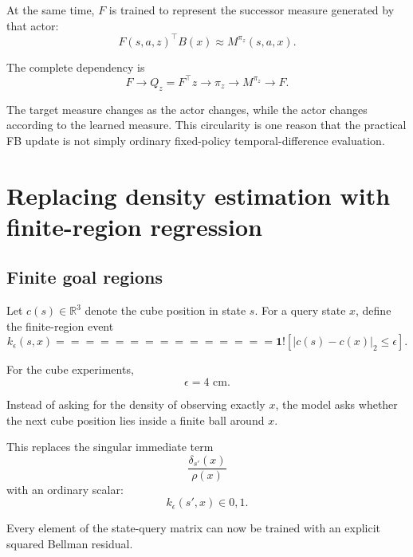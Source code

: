 \documentclass[10pt]{article}
\newcommand{\ind}[1]{\mathbf{1}!\left[#1\right]}
\begin{document}
At the same time, $F$ is trained to represent the successor measure generated by that
actor:
\begin{equation}
F(s,a,z)^\top B(x)
\approx
M^{\pi_z}(s,a,x).
\end{equation}

The complete dependency is
\begin{equation}
F
\longrightarrow
Q_z=F^\top z
\longrightarrow
\pi_z
\longrightarrow
M^{\pi_z}
\longrightarrow
F.
\end{equation}

The target measure changes as the actor changes, while the actor changes according to the
learned measure.
This circularity is one reason that the practical FB update is not simply ordinary
fixed-policy temporal-difference evaluation.

\section{Replacing density estimation with finite-region regression}

\subsection{Finite goal regions}

Let $c(s)\in\mathbb{R}^3$ denote the cube position in state $s$.
For a query state $x$, define the finite-region event
\begin{equation}
k_\epsilon(s,x)
===============

\ind{
|c(s)-c(x)|_2
\leq
\epsilon
}.
\label{eq:kernel}
\end{equation}

For the cube experiments,
\begin{equation}
\epsilon=4\text{ cm}.
\end{equation}

Instead of asking for the density of observing exactly $x$, the model asks whether the
next cube position lies inside a finite ball around $x$.

This replaces the singular immediate term
\begin{equation}
\frac{\delta_{s'}(x)}{\rho(x)}
\end{equation}
with an ordinary scalar:
\begin{equation}
k_\epsilon(s',x)\in{0,1}.
\end{equation}

Every element of the state-query matrix can now be trained with an explicit squared
Bellman residual.
\end{document}
